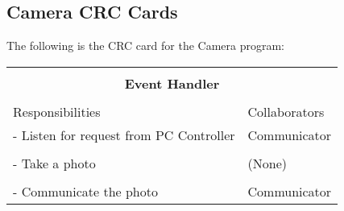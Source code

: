 \documentclass[titlepage]{article}
\begin{document}
\subsection{Camera CRC Cards}
The following is the CRC card for the Camera program:\\
\begin{table}[!htbp]
\centering
\begin{tabular}{| p{} | p{} |}\hline
	\multicolumn{2}{|l|}{}\\
	\multicolumn{2}{|c|}{\large{\textbf{Event Handler}}}\\
	\multicolumn{2}{|l|}{}\\\hline
	\vspace{0mm}\large{Responsibilities}\vspace{2mm} &\vspace{0mm}\large{Collaborators}\vspace{2mm}\\\hline
	\vspace{0mm}- Listen for request from PC Controller	&\vspace{0mm}Communicator\\&\\
	- Take a photo										&(None)\\&\\
	- Communicate the photo\vspace{2mm}					&Communicator\vspace{2mm}\\\hline
\end{tabular}
\end{table}
\end{document}

